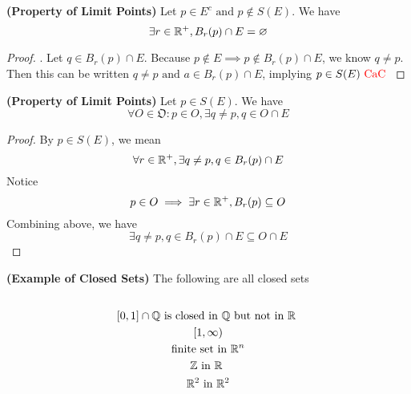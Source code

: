 \documentclass{report}
\begin{document}
\begin{theorem}
\label{2.7.13}
\textbf{(Property of Limit Points)} Let $p\in  E^c\text{ and }p\not\in S(E)$. We have 
\begin{equation}
\exists r\in\mathbb{R}^+, B_r(p)\cap E=\varnothing
\end{equation}
\end{theorem}
\begin{proof}
. Let $q\in B_r(p)\cap E$. Because $p\not\in E\implies p\not\in B_r(p)\cap E$, we know $q\neq p$. Then this can be written $q\neq p \text{ and }a \in B_r(p)\cap E$, implying $p \in S(E)\text{ \textcolor{red}{CaC} }$
\end{proof}
\begin{theorem}
\label{2.7.14}
\textbf{(Property of Limit Points)} Let $p \in S(E)$. We have
\begin{equation}
\forall O\in\mathfrak{O}:p\in  O, \exists q\neq p, q \in O \cap E
\end{equation}
\end{theorem}
\begin{proof}
By $p\in  S(E)$, we mean
\begin{equation}
\forall r\in\mathbb{R}^+,\exists q\neq p,q\in B_r(p)\cap E
\end{equation}
Notice
 \begin{equation}
p\in O\implies \exists r\in\mathbb{R}^+, B_r(p)\subseteq O
\end{equation}
Combining above, we have
\begin{equation}
\exists q\neq p,q\in B_r(p)\cap E\subseteq O\cap E
\end{equation}
\end{proof}
\begin{theorem}
\label{2.7.15}
\textbf{(Example of Closed Sets)} The following are all closed sets
\begin{gather}
[a,b]\\
[0,1]\cap \Q \text{ is closed in $\Q$ but not in  $\R$ } \\
[1,\infty) \\
\text{ finite set in $\R^n$ } \\
\Z  \text{ in $\R$ }\\
\R^2 \text{ in  }\R^2
\end{gather}
\end{theorem}
\end{document}
